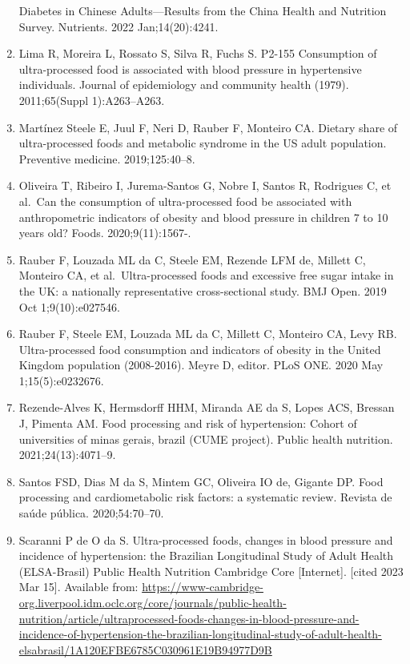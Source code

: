 \documentclass[
]{article}
\begin{document}
\begin{enumerate}
  Diabetes in Chinese Adults---Results from the China Health and
  Nutrition Survey. Nutrients. 2022 Jan;14(20):4241.
\item
  Lima R, Moreira L, Rossato S, Silva R, Fuchs S. P2-155 Consumption of
  ultra-processed food is associated with blood pressure in hypertensive
  individuals. Journal of epidemiology and community health (1979).
  2011;65(Suppl 1):A263--A263.
\item
  Martínez Steele E, Juul F, Neri D, Rauber F, Monteiro CA. Dietary
  share of ultra-processed foods and metabolic syndrome in the US adult
  population. Preventive medicine. 2019;125:40--8.
\item
  Oliveira T, Ribeiro I, Jurema-Santos G, Nobre I, Santos R, Rodrigues
  C, et al.~Can the consumption of ultra-processed food be associated
  with anthropometric indicators of obesity and blood pressure in
  children 7 to 10 years old? Foods. 2020;9(11):1567-.
\item
  Rauber F, Louzada ML da C, Steele EM, Rezende LFM de, Millett C,
  Monteiro CA, et al.~Ultra-processed foods and excessive free sugar
  intake in the UK: a nationally representative cross-sectional study.
  BMJ Open. 2019 Oct 1;9(10):e027546.
\item
  Rauber F, Steele EM, Louzada ML da C, Millett C, Monteiro CA, Levy RB.
  Ultra-processed food consumption and indicators of obesity in the
  United Kingdom population (2008-2016). Meyre D, editor. PLoS ONE. 2020
  May 1;15(5):e0232676.
\item
  Rezende-Alves K, Hermsdorff HHM, Miranda AE da S, Lopes ACS, Bressan
  J, Pimenta AM. Food processing and risk of hypertension: Cohort of
  universities of minas gerais, brazil (CUME project). Public health
  nutrition. 2021;24(13):4071--9.
\item
  Santos FSD, Dias M da S, Mintem GC, Oliveira IO de, Gigante DP. Food
  processing and cardiometabolic risk factors: a systematic review.
  Revista de saúde pública. 2020;54:70--70.
\item
  Scaranni P de O da S. Ultra-processed foods, changes in blood pressure
  and incidence of hypertension: the Brazilian Longitudinal Study of
  Adult Health (ELSA-Brasil) \textbar{} Public Health Nutrition
  \textbar{} Cambridge Core {[}Internet{]}. {[}cited 2023 Mar 15{]}.
  Available from:
  \url{https://www-cambridge-org.liverpool.idm.oclc.org/core/journals/public-health-nutrition/article/ultraprocessed-foods-changes-in-blood-pressure-and-incidence-of-hypertension-the-brazilian-longitudinal-study-of-adult-health-elsabrasil/1A120EFBE6785C030961E19B94977D9B}

\end{enumerate}
\end{document}
